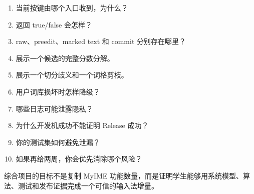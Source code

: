 \begin{enumerate}
  \item 当前按键由哪个入口收到，为什么？
  \item 返回 true/false 会怎样？
  \item raw、preedit、marked text 和 commit 分别存在哪里？
  \item 展示一个候选的完整分数分解。
  \item 展示一个切分歧义和一个词格剪枝。
  \item 用户词库损坏时怎样降级？
  \item 哪些日志可能泄露隐私？
  \item 为什么开发机成功不能证明 Release 成功？
  \item 你的测试集如何避免泄漏？
  \item 如果再给两周，你会优先消除哪个风险？
\end{enumerate}

\begin{summarybox}
综合项目的目标不是复制 MyIME 功能数量，而是证明学生能够用系统模型、算法、测试和发布证据完成一个可信的输入法增量。
\end{summarybox}
